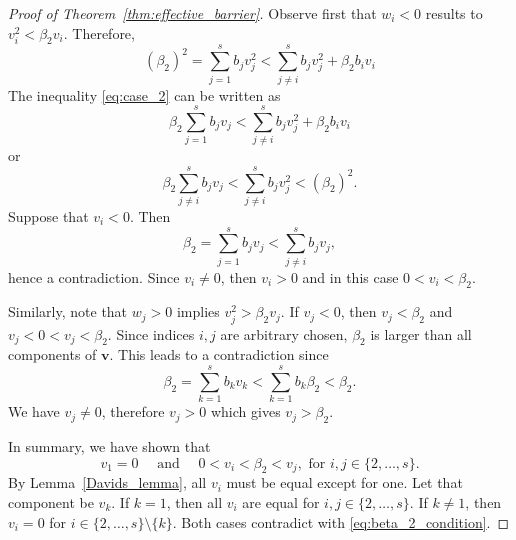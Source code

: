 \begin{proof}[Proof of Theorem~\ref{thm:effective_barrier}]
    Observe first that $w_i < 0$ results to $v_i^2 < \beta_2 v_i$. 
    Therefore,
    \begin{equation}\label{eq:case_2}
    		(\beta_2)^2 = \sum_{j=1}^s b_j v_j^2 < \sum_{j \neq i}^s b_j v_j^2 + \beta_2 b_i v_i
    	\end{equation}
    	The inequality \eqref{eq:case_2} can be written as
    	\begin{equation}\label{case_2_b}
    		\beta_2\sum_{j=1}^s b_j v_j < \sum_{j \neq i}^s b_j v_j^2 + \beta_2 b_i v_i
    	\end{equation}
    	or 
    	\begin{equation}\label{case_2_c}
            \beta_2\sum_{j \neq i}^s b_j v_j < \sum_{j \neq i}^s b_j v_j^2 < (\beta_2)^2.
    \end{equation}
    Suppose that $v_{i} < 0$. Then
    \begin{equation*}
    		\beta_2 = \sum_{j=1}^s b_j v_j < \sum_{j \neq i}^s b_j v_j,
    	\end{equation*}
    	hence a contradiction. 
    	Since $v_i \neq 0$, then $v_i > 0$ and in this case $0 < v_i < \beta_2$.
    	
    	Similarly, note that $w_j > 0$ implies $v_j^2 > \beta_2 v_j$. 
    	If $v_j < 0$, then $v_j < \beta_2$ and $v_j < 0 < v_j < \beta_2$. 
    	Since indices $i, j$ are arbitrary chosen, $\beta_2$ is larger than all 
    	components of $\bm{v}$. 
    	This leads to a contradiction since
    	\begin{equation*}
    		\beta_2 = \sum_{k=1}^s b_k v_k < \sum_{k=1}^s b_k\beta_2 < \beta_2.
    	\end{equation*}
    	We have $v_j \neq 0$, therefore $v_j > 0$ which gives $v_j > \beta_2$.
    	
    	In summary, we have shown that
    	\begin{equation}\label{eq:beta_2_condition}
    		v_1 = 0 \quad \text{ and } \quad 0 < v_i < \beta_2 < v_j, \text{ for } i, j \in \{2, \dots, s\}.
    \end{equation}
    By Lemma~\ref{Davids_lemma}, all $v_i$ must be equal except for one.
    Let that component be $v_k$. 
    If $k = 1$, then all $v_i$ are equal for $i, j \in \{2, \dots, s\}$. 
    If $k \neq 1$, then $v_i = 0$ for $i \in \{2,\dots,s\}\setminus\{k\}$. 
    Both cases contradict with \eqref{eq:beta_2_condition}.
\end{proof}
